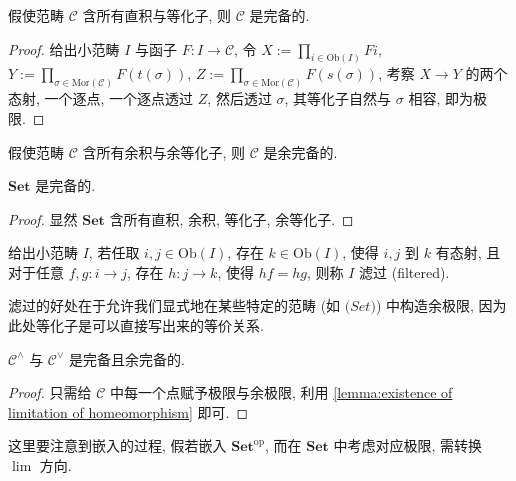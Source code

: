 \begin{theorem}
    假使范畴 \(\mathcal{C}\) 含所有直积与等化子, 则 \(\mathcal{C}\) 是完备的.

    \begin{proof}
        给出小范畴 \(I\) 与函子 \(F : I \to \mathcal{C}\), 令 \(X := \prod_{i \in \mathrm{Ob} (I)} F i\),
        \(Y := \prod_{\sigma \in \mathrm{Mor} (\mathcal{C})} F (t (\sigma))\), \(Z := \prod_{\sigma \in \mathrm{Mor} (\mathcal{C})} F (s (\sigma))\),
        考察 \(X \to Y\) 的两个态射, 一个逐点, 一个逐点透过 \(Z\), 然后透过 \(\sigma\), 其等化子自然与 \(\sigma\) 相容, 即为极限.
    \end{proof}
\end{theorem}

\begin{corollary}
    假使范畴 \(\mathcal{C}\) 含所有余积与余等化子, 则 \(\mathcal{C}\) 是余完备的.
\end{corollary}

\begin{lemma}
    \(\mathbf{Set}\) 是完备的.

    \begin{proof}
        显然 \(\mathbf{Set}\) 含所有直积, 余积, 等化子, 余等化子.
    \end{proof}
\end{lemma}

\begin{definition}[滤过]
    给出小范畴 \(I\), 若任取 \(i,j \in \mathrm{Ob} (I)\), 存在 \(k \in \mathrm{Ob} (I)\), 使得 \(i,j\) 到 \(k\) 有态射,
    且对于任意 \(f,g : i \to j\), 存在 \(h : j \to k\), 使得 \(h f = h g\), 则称 \(I\) 滤过 (filtered).
\end{definition}

滤过的好处在于允许我们显式地在某些特定的范畴 (如 \(\mathbf(Set)\)) 中构造余极限, 因为此处等化子是可以直接写出来的等价关系.

\begin{lemma}
    \(\mathcal{C}^{\wedge}\) 与 \(\mathcal{C}^{\vee}\) 是完备且余完备的.

    \begin{proof}
        只需给 \(\mathcal{C}\) 中每一个点赋予极限与余极限, 利用 \ref {lemma:existence of limitation of homeomorphism} 即可.
    \end{proof}
\end{lemma}

这里要注意到嵌入的过程, 假若嵌入 \(\mathbf{Set}^\mathrm{op}\), 而在 \(\mathbf{Set}\) 中考虑对应极限, 需转换 \(\lim\) 方向.

